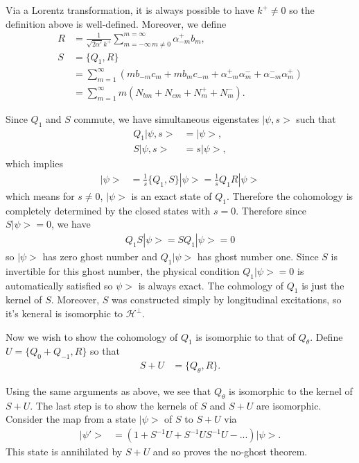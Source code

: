 \documentclass[notitlepage,amsmath,amssymb,aps, pra, 10pt]{revtex4-1}
\begin{document}
    Via a Lorentz transformation, it is always possible to have $k^+ \neq 0 $ so the definition above is well-defined. Moreover, we define
    \begin{align}
        R &= \frac{1}{\sqrt{2\alpha'} k^+} \sum_{m = -\infty\, m\neq 0} ^{m = \infty} \alpha_{-m}^+ b_m,\\
        S &= \{ Q_1, R\}\\
         &=\sum_{m = 1}^{\infty} (mb_{-m} c_m + mb_m c_{-m} +  \alpha_{-m}^+ \alpha_{m}^- +  \alpha_{-m}^- \alpha_{m}^+)\\
        &= \sum_{m = 1}^{\infty} m(N_{bm} + N_{cm} + N_{m}^+ + N_m^-).
    \end{align}

    Since $Q_1$ and $S$ commute, we have simultaneous eigenstates $|\psi, s>$ such that
    \begin{align}
        Q_1 |\psi, s> &= |\psi>,\\
        S |\psi, s> &= s|\psi > ,
    \end{align}
    which implies
    \begin{align}
        |\psi> &= \frac{1}{s} \{ Q_1, S\} |\psi> = \frac{1}{s} Q_1 R |\psi>
    \end{align}
    which means for $s\neq0$, $|\psi>$ is an exact state of $Q_1$. Therefore the cohomology is completely determined by the closed states with $s=0$. Therefore since $S|\psi> = 0$, we have
    \begin{align}
        Q_1 S |\psi> = S Q_1 |\psi> = 0
    \end{align}
    so $|\psi>$ has zero ghost number and $Q_1|\psi>$ has ghost number one. Since $S$ is invertible for this ghost number, the physical condition $Q_1 |\psi> = 0$ is automatically satisfied so $\psi>$ is always exact. The cohmology of $Q_1$ is just the kernel of $S$. Moreover, $S$ was constructed simply by longitudinal excitations, so it's keneral is isomorphic to $\mathcal{H}^{\perp}$.

    Now we wish to show the cohomology of $Q_1$ is isomorphic to that of $Q_{\theta}$. Define $U = \{Q_0+ Q_{-1}, R\}$ so that
    \begin{align}
        S + U &= \{Q_{\theta}, R\}.
    \end{align}

    Using the same arguments as above, we see that $Q_{\theta}$ is isomorphic to the kernel of $S+U$. The last step is to show the kernels of $S$ and $S+U$ are isomorphic. Consider the map from a state $|\psi>$ of $S$ to $S+U$ via
    \begin{align}
        |\psi'> &= (1+S^{-1}U + S^{-1}US^{-1}U -...) |\psi>.
    \end{align}
    This state is annihilated by $S+U$ and so proves the no-ghost theorem.
\end{document}
